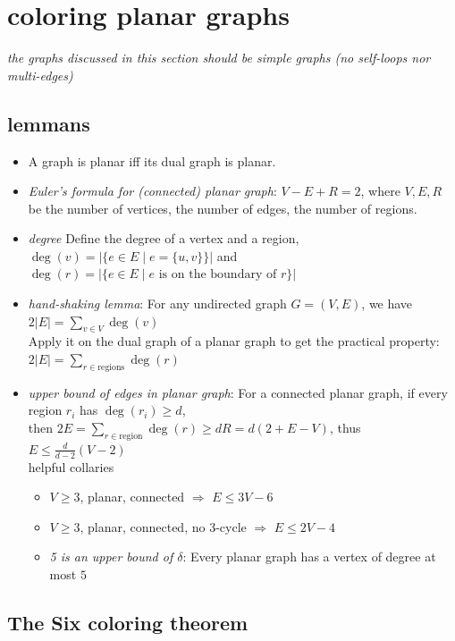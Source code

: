 \documentclass{article}
\begin{document}
\newpage
\section{coloring planar graphs}

\emph{the graphs discussed in this section should be simple graphs (no self-loops nor multi-edges)}

\subsection{lemmans}

\begin{itemize}
	\item A graph is planar iff its dual graph is planar.
	\item \emph{Euler's formula for (connected) planar graph}: $V-E+R=2$,
	      where $V,E,R$ be the number of vertices, the number of edges, the number of regions.
	\item \emph{degree} Define the degree of a vertex and a region,
	      $\deg(v)=\left|\{e\in E\mid e=\{u,v\}\}\right|$
	      and
	      $\deg(r)=\left|\{e\in E\mid \text{$e$ is on the boundary of $r$}\}\right|$
	\item \emph{hand-shaking lemma}: For any undirected graph $G=(V,E)$, we have $2|E|=\sum_{v\in V}\deg(v)$\\
	      Apply it on the dual graph of a planar graph to get the practical property: $2|E|=\sum_{r\in \text{regions}}\deg(r)$
	\item \emph{upper bound of edges in planar graph}: For a connected planar graph, if every region $r_i$ has $\deg(r_i)\geq d$,\\
	      then $2E=\sum_{r\in \text{region}}\deg(r)\geq dR=d(2+E-V)$,
	      thus $E\leq \frac{d}{d-2}(V-2)$\\
	      helpful collaries
	      \begin{itemize}
		      \item $V\geq 3$, planar, connected $\Rightarrow$ $E\leq 3V-6$
		      \item $V\geq 3$, planar, connected, no 3-cycle $\Rightarrow$ $E\leq 2V-4$
		      \item \emph{5 is an upper bound of $\delta$}: Every planar graph has a vertex of degree at most $5$
	      \end{itemize}
\end{itemize}

\subsection{The Six coloring theorem}
\end{document}
